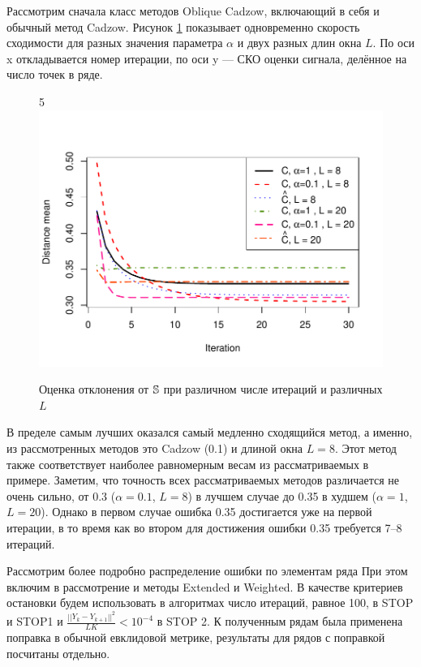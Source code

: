 \documentclass[12pt,a4paper,fleqn,leqno]{article}
\begin{document}
Рассмотрим сначала класс методов Oblique Cadzow, включающий в себя и обычный метод Cadzow.
Рисунок \ref{img_cadzowspeed2} показывает одновременно скорость сходимости для разных значения параметра $\alpha$ и двух разных длин окна $L$.
По оси x откладывается номер итерации, по оси y --- СКО оценки сигнала, делённое на число точек в ряде.  
\begin{figure}[!hhh] 
\begin{center}
5\includegraphics[width = 15cm]{cadzowspeed_2.pdf}
\caption{Оценка отклонения от $\mathbb{S}$ при различном числе итераций и различных $L$}
\label{img_cadzowspeed2}
\end{center}
\end{figure}

В пределе самым лучших оказался самый медленно сходящийся метод, а именно, из рассмотренных методов это Cadzow (0.1) и длиной окна $L=8$.
Этот метод также соответствует наиболее равномерным весам из рассматриваемых в примере.
Заметим, что точность всех рассматриваемых методов различается не очень сильно, от 0.3 ($\alpha=0.1$, $L=8$) в лучшем случае до 0.35 в худшем
($\alpha=1$, $L=20$). Однако в первом случае ошибка 0.35 достигается уже на первой итерации, в то время как во втором для
достижения ошибки 0.35 требуется 7--8 итераций.

Рассмотрим более подробно распределение ошибки по элементам ряда При этом включим в рассмотрение и
методы Extended и Weighted.
В качестве критериев остановки будем использовать в алгоритмах число итераций, равное 100, в STOP и STOP1
и $\frac{||Y_k - Y_{k+1}||^2}{LK} < 10^{-4}$ в STOP 2. К полученным рядам была применена поправка в обычной евклидовой метрике, результаты для рядов с поправкой посчитаны отдельно.
\end{document}
